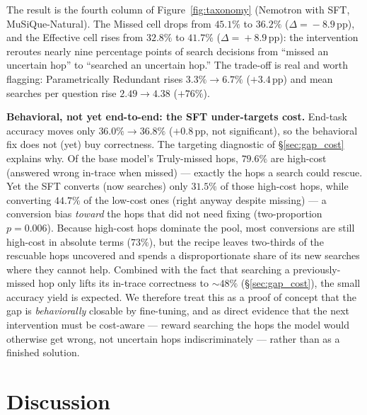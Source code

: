 \documentclass[10pt,letterpaper]{article}
\begin{document}
The result is the fourth column of Figure~\ref{fig:taxonomy} (Nemotron with SFT,
MuSiQue-Natural). The Missed cell drops from $45.1\%$ to $36.2\%$
($\Delta\!=\!-8.9\,\text{pp}$), and the Effective cell rises from $32.8\%$ to
$41.7\%$ ($\Delta\!=\!+8.9\,\text{pp}$): the intervention reroutes nearly
nine percentage points of search decisions from ``missed an uncertain hop'' to
``searched an uncertain hop.'' The trade-off is real and worth
flagging: Parametrically Redundant rises $3.3\%\!\to\!6.7\%$
($+3.4\,\text{pp}$) and mean searches per question rise $2.49\!\to\!4.38$
($+76\%$).

\textbf{Behavioral, not yet end-to-end: the SFT under-targets cost.} End-task
accuracy moves only $36.0\%\!\to\!36.8\%$ ($+0.8\,\text{pp}$, not significant), so
the behavioral fix does not (yet) buy correctness. The targeting diagnostic of
\S\ref{sec:gap_cost} explains why. Of the base model's Truly-missed hops, $79.6\%$
are high-cost (answered wrong in-trace when missed) --- exactly the hops a search
could rescue. Yet the SFT converts (now searches) only $31.5\%$ of those high-cost
hops, while converting $44.7\%$ of the low-cost ones (right anyway despite missing)
--- a conversion bias \emph{toward} the hops that did not need fixing
(two-proportion $p\!=\!0.006$). Because high-cost hops dominate the pool, most
conversions are still high-cost in absolute terms ($73\%$), but the recipe leaves
two-thirds of the rescuable hops uncovered and spends a disproportionate share of
its new searches where they cannot help. Combined with the fact that searching a
previously-missed hop only lifts its in-trace correctness to $\sim\!48\%$
(\S\ref{sec:gap_cost}), the small accuracy yield is expected. We therefore treat
this as a proof of concept that the gap is \emph{behaviorally} closable by
fine-tuning, and as direct evidence that the next intervention must be
cost-aware --- reward searching the hops the model would otherwise get wrong, not
uncertain hops indiscriminately --- rather than as a finished solution.

\section{Discussion}\label{sec:discussion}
\end{document}
